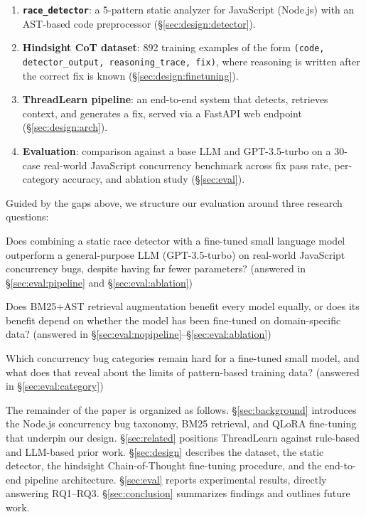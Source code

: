 \documentclass[runningheads]{llncs}
\begin{document}
\begin{enumerate}[leftmargin=2em]
  \item \textbf{\texttt{race\_detector}}: a 5-pattern static analyzer for
    JavaScript (Node.js) with an AST-based code preprocessor
    (\S\ref{sec:design:detector}).
  \item \textbf{Hindsight CoT dataset}: 892 training examples of the form
    \texttt{(code, detector\_output, reasoning\_trace, fix)}, where
    reasoning is written after the correct fix is known
    (\S\ref{sec:design:finetuning}).
  \item \textbf{ThreadLearn pipeline}: an end-to-end system that detects,
    retrieves context, and generates a fix, served via a FastAPI
    web endpoint (\S\ref{sec:design:arch}).
  \item \textbf{Evaluation}: comparison against a base LLM and GPT-3.5-turbo
    on a 30-case real-world JavaScript concurrency benchmark across fix pass
    rate, per-category accuracy, and ablation study (\S\ref{sec:eval}).
\end{enumerate}

Guided by the gaps above, we structure our evaluation around three research
questions:

\begin{description}[leftmargin=2.5em]
  \item[RQ1] Does combining a static race detector with a fine-tuned small
    language model outperform a general-purpose LLM (GPT-3.5-turbo) on
    real-world JavaScript concurrency bugs, despite having far fewer
    parameters? (answered in \S\ref{sec:eval:pipeline} and
    \S\ref{sec:eval:ablation})
  \item[RQ2] Does BM25+AST retrieval augmentation benefit every model
    equally, or does its benefit depend on whether the model has been
    fine-tuned on domain-specific data? (answered in
    \S\ref{sec:eval:nopipeline}--\S\ref{sec:eval:ablation})
  \item[RQ3] Which concurrency bug categories remain hard for a fine-tuned
    small model, and what does that reveal about the limits of pattern-based
    training data? (answered in \S\ref{sec:eval:category})
\end{description}

The remainder of the paper is organized as follows.
\S\ref{sec:background} introduces the Node.js concurrency bug taxonomy,
BM25 retrieval, and QLoRA fine-tuning that underpin our design.
\S\ref{sec:related} positions ThreadLearn against rule-based and
LLM-based prior work.
\S\ref{sec:design} describes the dataset, the static detector, the
hindsight Chain-of-Thought fine-tuning procedure, and the end-to-end
pipeline architecture.
\S\ref{sec:eval} reports experimental results, directly answering RQ1--RQ3.
\S\ref{sec:conclusion} summarizes findings and outlines future work.
\end{document}
